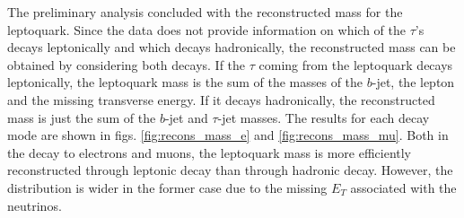 The preliminary analysis concluded with the reconstructed mass for the leptoquark. Since the data does not provide information on which of the $\tau$'s decays leptonically and which decays hadronically, the reconstructed mass can be obtained by considering both decays. If the $\tau$ coming from the leptoquark decays leptonically, the leptoquark mass is the sum of the masses of the $b$-jet, the lepton and the missing transverse energy. If it decays hadronically, the reconstructed mass is just the sum of the $b$-jet and $\tau$-jet masses. The results for each decay mode are shown in figs. \ref{fig:recons_mass_e} and \ref{fig:recons_mass_mu}. Both in the decay to electrons and muons, the leptoquark mass is more efficiently reconstructed through leptonic decay than through hadronic decay. However, the distribution is wider in the former case due to the missing $E_T$ associated with the neutrinos.


